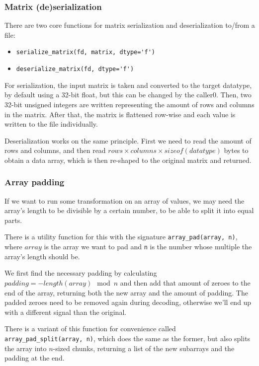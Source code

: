\subsubsection{Matrix (de)serialization}
There are two core functions for matrix serialization and deserialization to/from a file:

\begin{itemize}
	\item \verb|serialize_matrix(fd, matrix, dtype='f')|
	\item \verb|deserialize_matrix(fd, dtype='f')|
\end{itemize}

For serialization, the input matrix is taken and converted to the target datatype, by default using a 32-bit float, but this can be changed by the caller0. Then, two 32-bit unsigned integers are written representing the amount of rows and columns in the matrix. After that, the matrix is flattened row-wise and each value is written to the file individually.

Deserialization works on the same principle. First we need to read the amount of rows and columns, and then read $rows \times columns \times sizeof(datatype)$ bytes to obtain a data array, which is then re-shaped to the original matrix and returned.

\subsubsection{Array padding}
If we want to run some transformation on an array of values, we may need the array's length to be divisible by a certain number, to be able to split it into equal parts.

There is a utility function for this with the signature \verb|array_pad(array, n)|, where $array$ is the array we want to pad and \verb|n| is the number whose multiple the array's length should be.

We first find the necessary padding by calculating $padding = -length(array) \mod n$ and then add that amount of zeroes to the end of the array, returning both the new array and the amount of padding. The padded zeroes need to be removed again during decoding, otherwise we'll end up with a different signal than the original.

There is a variant of this function for convenience called \verb|array_pad_split(array, n)|, which does the same as the former, but also splits the array into $n$-sized chunks, returning a list of the new subarrays and the padding at the end.

